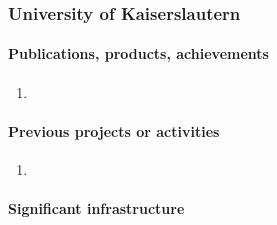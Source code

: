 \subsubsection{University of Kaiserslautern}




\paragraph{Publications, products, achievements}

\begin{enumerate}
\item {}
\end{enumerate}

\paragraph{Previous projects or activities}

\begin{enumerate}
\item {}
\end{enumerate}

\paragraph{Significant infrastructure}

